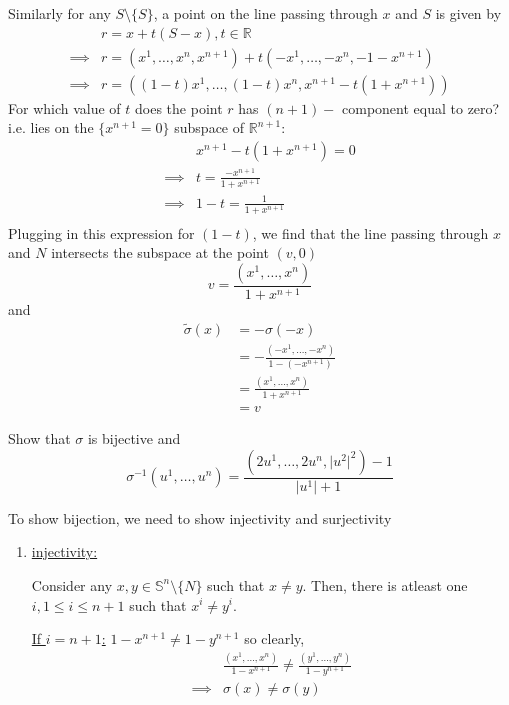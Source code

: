 \documentclass{article}
\newcommand{\R}{\mathbb{R}}
\begin{document}
\begin{enumerate}[label=(\alph*)]
  Similarly for any $S \setminus \{S\}$, a point on the line passing through $x$ and $S$ is given by 
  \begin{align*}
    &r = x + t(S - x), t \in \R \\
    \implies& r = (x^1, \dots, x^{n}, x^{n+1}) + t(-x^1, \dots, -x^{n}, -1-x^{n+1}) \\
    \implies& r = \left( (1-t)x^1, \dots, (1-t)x^n, x^{n+1} - t(1 + x^{n+1}) \right)
  \end{align*}
  For which value of $t$ does the point $r$ has $(n+1)-$ component equal to zero? i.e. lies on the $\{x^{n+1} = 0\}$ subspace of $\mathbb{R}^{n+1}$:
  \begin{align*}
    &x^{n+1} - t(1+x^{n+1}) = 0 \\
    \implies& \boxed{t = \frac{-x^{n+1}}{1+x^{n+1}}} \\
    \implies& \boxed{1 - t = \frac{1}{1+x^{n+1}}} \\
  \end{align*}
  Plugging in this expression for $(1-t)$, we find that the line passing through $x$ and $N$ intersects the subspace at the point $(v, 0)$
  \[ v = \frac{(x^1, \dots, x^{n})}{1 + x^{n+1}} \]
  and 
  \begin{align*}
    \tilde{\sigma}(x) &= -\sigma(-x) \\
    &= -\frac{(-x^1, \dots, -x^n)}{1 - (-x^{n+1})} \\
    &= \frac{(x^1, \dots, x^n)}{1 + x^{n+1}} \\
    &= v
  \end{align*}

  \vskip 1cm
  \begin{dottedbox}
    \item Show that $\sigma$ is bijective and 
    \[ \sigma^{-1}(u^1, \dots, u^{n}) = \frac{(2u^1, \dots, 2u^n, \lvert u^2 \rvert^2) - 1}{\lvert u^1 \rvert + 1} \]
  \end{dottedbox}
  \vskip 0.5cm
  To show bijection, we need to show injectivity and surjectivity
  \begin{enumerate}[label=(\arabic*),ref=\arabic*]
    \item \underline{injectivity:} 
    
    Consider any $x, y \in \mathbb{S}^n \setminus \{N\}$ such that $x \neq y$. Then, there is atleast one $i, 1 \leq i \leq n+1$ such that $x^i \neq y^i$.
    
    \vskip 0.25cm
    \underline{If $i = n+1$:} $1 - x^{n+1} \neq 1 - y^{n+1}$ so clearly, 
    \begin{align*}
      &\frac{(x^1, \dots, x^{n})}{1 - x^{n+1}} \neq \frac{(y^1, \dots, y^{n})}{1 - y^{n+1}} \\
      \implies &\sigma(x) \neq \sigma(y)
    \end{align*} 


\end{enumerate}
\end{enumerate}
\end{document}
